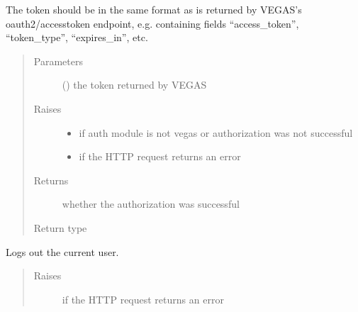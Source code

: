 \documentclass[letterpaper,10pt,english]{sphinxmanual}
\begin{document}
\begin{fulllineitems}
\begin{fulllineitems}
\sphinxAtStartPar
The token should be in the same format as is returned by VEGAS’s oauth2/accesstoken
endpoint, e.g. containing fields “access\_token”, “token\_type”, “expires\_in”, etc.
\begin{quote}\begin{description}
\item[{Parameters}] \leavevmode
\sphinxAtStartPar
{} () \textendash{} the token returned by VEGAS

\item[{Raises}] \leavevmode\begin{itemize}
\item {} 
\sphinxAtStartPar
{\hyperref[\detokenize{autoapi/pine/client/exceptions/index:pine.client.exceptions.PineClientAuthException}]{}} \textendash{} if auth module is not vegas or authorization was not successful

\item {} 
\sphinxAtStartPar
{\hyperref[\detokenize{autoapi/pine/client/exceptions/index:pine.client.exceptions.PineClientHttpException}]{}} \textendash{} if the HTTP request returns an error

\end{itemize}

\item[{Returns}] \leavevmode
\sphinxAtStartPar
whether the authorization was successful

\item[{Return type}] \leavevmode
\sphinxAtStartPar
{}

\end{description}\end{quote}

\end{fulllineitems}


\begin{fulllineitems}
\label{\detokenize{autoapi/pine/client/index:pine.client.PineClient.logout}}
\sphinxAtStartPar
Logs out the current user.
\begin{quote}\begin{description}
\item[{Raises}] \leavevmode
\sphinxAtStartPar
{\hyperref[\detokenize{autoapi/pine/client/exceptions/index:pine.client.exceptions.PineClientHttpException}]{}} \textendash{} if the HTTP request returns an error


\end{description}
\end{quote}
\end{fulllineitems}
\end{fulllineitems}
\end{document}
